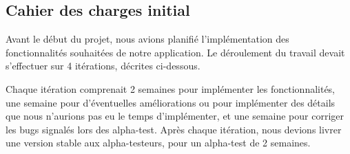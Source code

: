 \documentclass[a4paper,11pt,french]{article}
\begin{document}
{\subsection{Cahier des charges initial}
Avant le début du projet, nous avions planifié l'implémentation des fonctionnalités souhaitées de notre application. Le déroulement du
travail devait s'effectuer sur 4 itérations, décrites ci-dessous.

Chaque itération comprenait 2 semaines pour implémenter les fonctionnalités, une semaine pour d'éventuelles améliorations ou pour
implémenter des détails que nous n'aurions pas eu le temps d'implémenter, et une semaine pour corriger les bugs signalés lors des
alpha-test. Après chaque itération, nous devions livrer une version stable aux alpha-testeurs, pour un alpha-test de 2 semaines.

}
\end{document}
